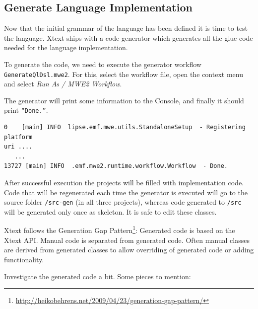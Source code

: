 \subsection{Generate Language Implementation}

Now that the initial grammar of the language has been defined it is time to test
the language. Xtext ships with a code generator which generates all the glue
code needed for the language implementation.

To generate the code, we need to execute the generator workflow
\texttt{GenerateQlDsl.mwe2}. For this, select the workflow file, open the context menu
and select \emph{Run As / MWE2 Workflow}.

The generator will print some information to the Console, and finally it should
print \texttt{``Done.''}.

\begin{lstlisting}
0    [main] INFO  lipse.emf.mwe.utils.StandaloneSetup  - Registering platform
uri ....
   ...
13727 [main] INFO  .emf.mwe2.runtime.workflow.Workflow  - Done.
\end{lstlisting}

After successful execution the projects will be filled with implementation code.
Code that will be regenerated each time the generator is executed will go to the
source folder \texttt{/src-gen} (in all three projects), whereas code generated to
\texttt{/src} will be generated only once as skeleton. It is safe to edit these
classes.

Xtext follows the Generation Gap
Pattern\footnote{\url{http://heikobehrens.net/2009/04/23/generation-gap-pattern/}}:
Generated code is based on the Xtext API. Manual code is separated from
generated code. Often manual classes are derived from generated classes to allow
overriding of generated code or adding functionality.

Investigate the generated code a bit. Some pieces to mention:

